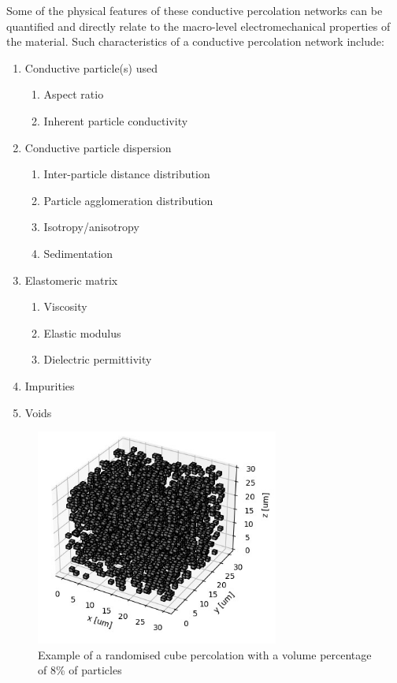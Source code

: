 Some of the physical features of these conductive percolation networks can be quantified and directly relate to the macro-level electromechanical properties of the material. Such characteristics of a conductive percolation network include:
\begin{enumerate}
    \item Conductive particle(s) used
    \begin{enumerate}
        \item Aspect ratio \cite{Wu2019,Flandin1999}
        \item Inherent particle conductivity
    \end{enumerate}
    \item Conductive particle dispersion \cite{Kim2012}
    \begin{enumerate}
        \item Inter-particle distance distribution
        \item Particle agglomeration distribution \cite{Pegel2008}
        \item Isotropy/anisotropy \cite{Song2022}
        \item Sedimentation \cite{Eklund2019}
    \end{enumerate}
    \item Elastomeric matrix
    \begin{enumerate}
        \item Viscosity
        \item Elastic modulus
        \item Dielectric permittivity
    \end{enumerate}
    \item Impurities
    \item Voids
\end{enumerate}

\begin{figure}[H]
    \centering
    \includegraphics[width=8cm]{Figures/simple_random_percolation.jpg}
    \caption{Example of a randomised cube percolation with a volume percentage of 8\% of particles}
    \label{fig:simp_rand_perc}
\end{figure}

